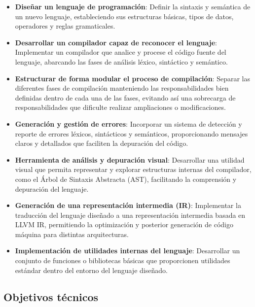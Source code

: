 
\begin{itemize}
    \item \textbf{Diseñar un lenguaje de programación}: 
    Definir la sintaxis y semántica de un nuevo lenguaje, estableciendo sus estructuras básicas, tipos de datos, operadores y reglas gramaticales.

    \item \textbf{Desarrollar un compilador capaz de reconocer el lenguaje}: 
    Implementar un compilador que analice y procese el código fuente del lenguaje, abarcando las fases de análisis léxico, sintáctico y semántico.

    \item \textbf{Estructurar de forma modular el proceso de compilación}: 
    Separar las diferentes fases de compilación manteniendo las responsabilidades bien definidas dentro de cada una de las fases, evitando así una sobrecarga de responsabilidades que dificulte realizar ampliaciones o modificaciones.

    \item \textbf{Generación y gestión de errores}: 
    Incorporar un sistema de detección y reporte de errores léxicos, sintácticos y semánticos, proporcionando mensajes claros y detallados que faciliten la depuración del código.

    \item \textbf{Herramienta de análisis y depuración visual}: 
    Desarrollar una utilidad visual que permita representar y explorar estructuras internas del compilador, como el Árbol de Sintaxis Abstracta (AST), facilitando la comprensión y depuración del lenguaje.

    \item \textbf{Generación de una representación intermedia (IR)}: 
    Implementar la traducción del lenguaje diseñado a una representación intermedia basada en LLVM IR, permitiendo la optimización y posterior generación de código máquina para distintas arquitecturas.

    \item \textbf{Implementación de utilidades internas del lenguaje}: 
    Desarrollar un conjunto de funciones o bibliotecas básicas que proporcionen utilidades estándar dentro del entorno del lenguaje diseñado.
\end{itemize}

\subsection{Objetivos técnicos}

